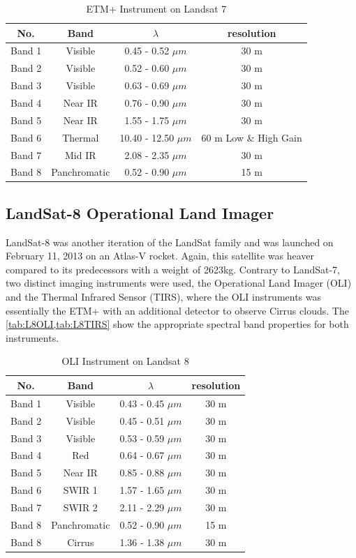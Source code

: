 \begin{table}[h!]
	\centering
	\begin{tabular}{ | c | c | c | c |}
	\hline
	\textbf{No.} & \textbf{Band} & \textbf{$\lambda$} & \textbf{resolution} \\
	\hline
	Band 1 & Visible & 0.45 - 0.52 $\mu m$ & {30 m} \\
	Band 2 & Visible & 0.52 - 0.60 $\mu m$ & {30 m} \\
	Band 3 & Visible & 0.63 - 0.69 $\mu m$ & {30 m} \\
	Band 4 & Near IR & 0.76 - 0.90 $\mu m$ & {30 m} \\
	Band 5 & Near IR & 1.55 - 1.75 $\mu m$ & {30 m} \\
	Band 6 & Thermal & 10.40 - 12.50 $\mu m$ & {60 m Low \& High Gain} \\
	Band 7 & Mid IR & 2.08 - 2.35 $\mu m$ & {30 m} \\
	Band 8 & Panchromatic & 0.52 - 0.90 $\mu m$ & {15 m} \\
	\hline
	\end{tabular}
	\caption{ETM+ Instrument on Landsat 7}
	\label{tab:L7ETM}
\end{table}


\subsection{LandSat-8 Operational Land Imager}
LandSat-8 was another iteration of the LandSat family and was launched on February 11, 2013 on an Atlas-V rocket. Again, this satellite was heaver compared to its predecessors with a weight of 2623kg. Contrary to LandSat-7, two distinct imaging instruments were used, the Operational Land Imager (OLI) and the Thermal Infrared Sensor (TIRS), where the OLI instruments was essentially the ETM+ with an additional detector to observe Cirrus clouds. The \cref{tab:L8OLI,tab:L8TIRS} show the appropriate spectral band properties for both instruments.

\begin{table}[h!]
	\centering
	\begin{tabular}{ | c | c | c | c |}
	\hline
	\textbf{No.} & \textbf{Band} & \textbf{$\lambda$} & \textbf{resolution} \\
	\hline
	Band 1 & Visible & 0.43 - 0.45 $\mu m$ & {30 m} \\
	Band 2 & Visible & 0.45 - 0.51 $\mu m$ & {30 m} \\
	Band 3 & Visible & 0.53 - 0.59 $\mu m$ & {30 m} \\
	Band 4 & Red & 0.64 - 0.67 $\mu m$ & {30 m} \\
	Band 5 & Near IR & 0.85 - 0.88 $\mu m$ & {30 m} \\
	Band 6 & SWIR 1 & 1.57 - 1.65  $\mu m$ & {30 m} \\
	Band 7 & SWIR 2 & 2.11 - 2.29 $\mu m$ & {30 m} \\
	Band 8 & Panchromatic & 0.52 - 0.90 $\mu m$ & {15 m} \\
	Band 8 & Cirrus & 1.36 - 1.38 $\mu m$ & {30 m} \\
	\hline
	\end{tabular}
	\caption{OLI Instrument on Landsat 8}
	\label{tab:L8OLI}
\end{table}

